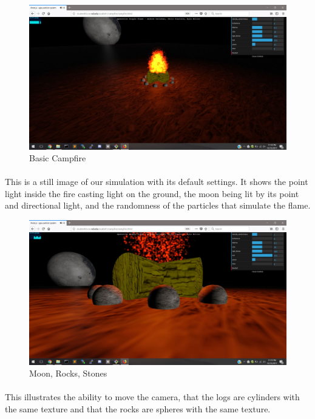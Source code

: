 \documentclass[letterpaper]{article}
\begin{document}
\begin{figure}[H]
\centering
\includegraphics[scale=.35]{result1.JPG}
\caption{Basic Campfire}
\label{fig:result1}
\end{figure}
\paragraph{}
This is a still image of our simulation with its default settings. It shows the point light inside the fire casting light on the ground, the moon being lit by its point and directional light, and the randomness of the particles that simulate the flame.

\begin{figure}[H]
\centering
\includegraphics[scale=.35]{result2.JPG}
\caption{Moon, Rocks, Stones}
\label{fig:result2}
\end{figure}
\paragraph{}
This illustrates the ability to move the camera, that the logs are cylinders with the same texture and that the rocks are spheres with the same texture.
\end{document}

